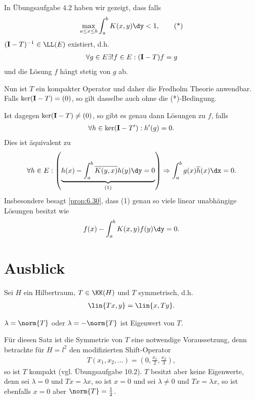 In Übungsaufgabe 4.2 haben wir gezeigt, dass falls
\begin{align*}
\max\limits_{a\le x\le b} \int_a^b K(x,y)\dy < 1,\tag{*}
\end{align*}
$(\Id-T)^{-1}\in\LL(E)$ existiert, d.h.
\begin{align*}
\forall g\in E \exists ! f\in E : (\mathbf{I}-T)f = g
\end{align*}
und die Lösung $f$ hängt stetig von $g$ ab.

Nun ist $T$ ein kompakter Operator und daher die Fredholm Theorie anwendbar.
Falls $\ker(\mathbf{I}-T) = (0)$, so gilt dasselbe auch ohne die (*)-Bedingung.

Ist dagegen $\ker(\mathbf{I}-T)\neq (0)$, so gibt es genau dann Lösungen zu $f$, falls
\begin{align*}
\forall h\in \ker(\mathbf{I}-T') : h'(g) = 0.
\end{align*}
Dies ist äquivalent zu
\begin{align*}
\forall h\in E : \left(\underbrace{h(x) - \int_a^b \overline{K(y,x)}h(y)\dy =
0}_{(1)} \right) \Rightarrow \int_a^b g(x)\overline{h}(x)\dx = 0 .
\end{align*}
Insbesondere besagt \ref{prop:6.30}, dass (1) genau so viele linear unabhängige
Lösungen besitzt wie
\begin{align*}
f(x)-\int_a^b K(x,y)f(y)\dy = 0.
\end{align*}

\section{Ausblick}

Sei $H$ ein Hilbertraum, $T\in \KK(H)$ und $T$ symmetrisch, d.h.
\begin{align*}
\lin{Tx,y} = \lin{x,Ty}.
\end{align*}

\begin{prop}
$\lambda=\norm{T}$ oder $\lambda=-\norm{T}$ ist Eigenwert von $T$.\fishhere
\end{prop}

Für diesen Satz ist die Symmetrie von $T$ eine notwendige Voraussetzung, denn
betrachte für $H=l^2$ den modifizierten Shift-Operator
\begin{align*}
T(x_1,x_2,\ldots) = (0,\frac{x_1}{2},\frac{x_2}{3}), 
\end{align*}
so ist $T$ kompakt (vgl. Übungsaufgabe 10.2). $T$ besitzt aber keine
Eigenwerte, denn sei $\lambda = 0$ und $Tx = \lambda x$, so ist $x=0$ und sei
$\lambda \neq 0$ und $Tx = \lambda x$, so ist ebenfalls $x=0$ aber
$\norm{T}=\frac{1}{2}$.

